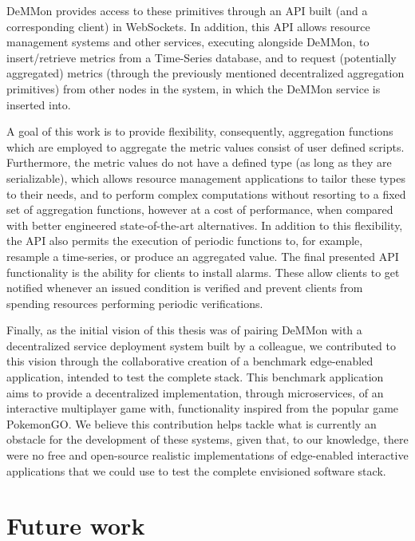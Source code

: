 DeMMon provides access to these primitives through an API built (and a corresponding client) in WebSockets. In addition, this API allows resource management systems and other services, executing alongside DeMMon, to insert/retrieve metrics from a Time-Series database, and to request (potentially aggregated) metrics (through the previously mentioned decentralized aggregation primitives) from other nodes in the system, in which the DeMMon service is inserted into.

A goal of this work is to provide flexibility, consequently, aggregation functions which are employed to aggregate the metric values consist of user defined scripts. Furthermore, the metric values do not have a defined type (as long as they are serializable), which allows resource management applications to tailor these types to their needs, and to perform complex computations without resorting to a fixed set of aggregation functions, however at a cost of performance, when compared with better engineered state-of-the-art alternatives. In addition to this flexibility, the API also permits the execution of periodic functions to, for example, resample a time-series, or produce an aggregated value. The final presented API functionality is the ability for clients to install alarms. These allow clients to get notified whenever an issued condition is verified and prevent clients from spending resources performing periodic verifications. 

Finally, as the initial vision of this thesis was of pairing DeMMon with a decentralized service deployment system built by a colleague, we contributed to this vision through the collaborative creation of a benchmark edge-enabled application, intended to test the complete stack. This benchmark application aims to provide a decentralized implementation, through microservices, of an interactive multiplayer game with, functionality inspired from the popular game PokemonGO. We believe this contribution helps tackle what is currently an obstacle for the development of these systems, given that, to our knowledge, there were no free and open-source realistic implementations of edge-enabled interactive applications that we could use to test the complete envisioned software stack.

\section{Future work}


